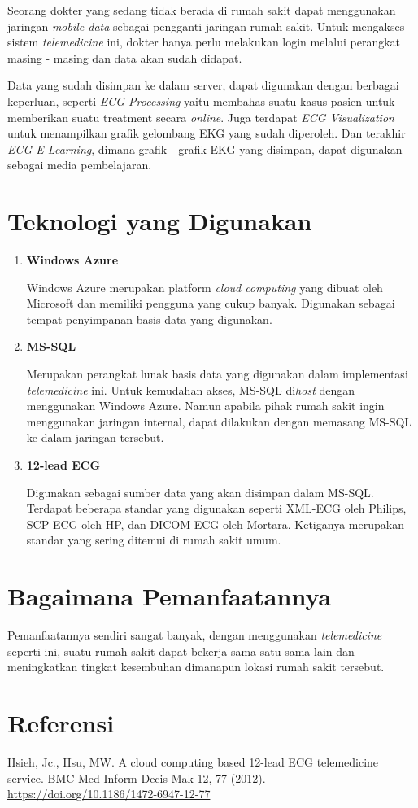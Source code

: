 \documentclass[12pt, a4paper]{article}
\begin{document}
Seorang dokter yang sedang tidak berada di rumah sakit dapat menggunakan jaringan \textit{mobile data} sebagai pengganti jaringan rumah sakit. Untuk mengakses sistem \textit{telemedicine} ini, dokter hanya perlu melakukan login melalui perangkat masing - masing dan data akan sudah didapat.

Data yang sudah disimpan ke dalam server, dapat digunakan dengan berbagai keperluan, seperti \textit{ECG Processing} yaitu membahas suatu kasus pasien untuk memberikan suatu treatment secara \textit{online}. Juga terdapat \textit{ECG Visualization} untuk menampilkan grafik gelombang EKG yang sudah diperoleh. Dan terakhir \textit{ECG E-Learning}, dimana grafik - grafik EKG yang disimpan, dapat digunakan sebagai media pembelajaran.

\section*{Teknologi yang Digunakan}

\begin{enumerate}
    \item \textbf{Windows Azure}

          Windows Azure merupakan platform \textit{cloud computing} yang dibuat oleh Microsoft dan memiliki pengguna yang cukup banyak. Digunakan sebagai tempat penyimpanan basis data yang digunakan.

    \item \textbf{MS-SQL}

          Merupakan perangkat lunak basis data yang digunakan dalam implementasi \textit{telemedicine} ini. Untuk kemudahan akses, MS-SQL di\textit{host} dengan menggunakan Windows Azure. Namun apabila pihak rumah sakit ingin menggunakan jaringan internal, dapat dilakukan dengan memasang MS-SQL ke dalam jaringan tersebut.

    \item \textbf{12-lead ECG}

          Digunakan sebagai sumber data yang akan disimpan dalam MS-SQL. Terdapat beberapa standar yang digunakan seperti XML-ECG oleh Philips, SCP-ECG oleh HP, dan DICOM-ECG oleh Mortara. Ketiganya merupakan standar yang sering ditemui di rumah sakit umum.

\end{enumerate}

\section*{Bagaimana Pemanfaatannya}
Pemanfaatannya sendiri sangat banyak, dengan menggunakan \textit{telemedicine} seperti ini, suatu rumah sakit dapat bekerja sama satu sama lain dan meningkatkan tingkat kesembuhan dimanapun lokasi rumah sakit tersebut.

\section*{Referensi}

\noindent Hsieh, Jc., Hsu, MW. A cloud computing based 12-lead ECG telemedicine service. BMC Med Inform Decis Mak 12, 77 (2012). \url{https://doi.org/10.1186/1472-6947-12-77}
\end{document}
